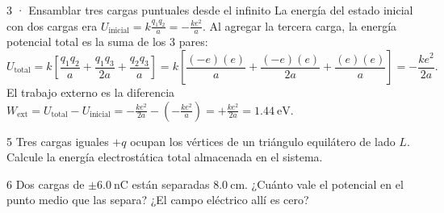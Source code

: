 \documentclass[11pt]{article}
\begin{document}
\begin{eResuelto}{3 · Ensamblar tres cargas puntuales desde el infinito}
La energía del estado inicial con dos cargas era $U_{\text{inicial}}=k\frac{q_1q_2}{a}=-\frac{ke^2}{a}$.
Al agregar la tercera carga, la energía potencial total es la suma de los 3 pares:
\[ U_{\text{total}} = k\left[\frac{q_1q_2}{a} + \frac{q_1q_3}{2a} + \frac{q_2q_3}{a}\right] = k\left[\frac{(-e)(e)}{a} + \frac{(-e)(e)}{2a} + \frac{(e)(e)}{a}\right] = -\frac{ke^2}{2a}. \]
El trabajo externo es la diferencia $W_{\text{ext}}=U_{\text{total}}-U_{\text{inicial}}=-\frac{ke^2}{2a}-\left(-\frac{ke^2}{a}\right)=+\frac{ke^2}{2a}=\SI{1,44}{\electronvolt}$.
\end{eResuelto}

\begin{eReto}{5 }
Tres cargas iguales $+q$ ocupan los vértices de un triángulo equilátero de lado $L$. Calcule la energía electrostática total almacenada en el sistema.
\end{eReto}

\begin{eReto}{6 }
Dos cargas de $\pm\SI{6,0}{\nano\coulomb}$ están separadas $\SI{8,0}{\centi\metre}$. ¿Cuánto vale el potencial en el punto medio que las separa? ¿El campo eléctrico allí es cero?
\end{eReto}

\end{document}
